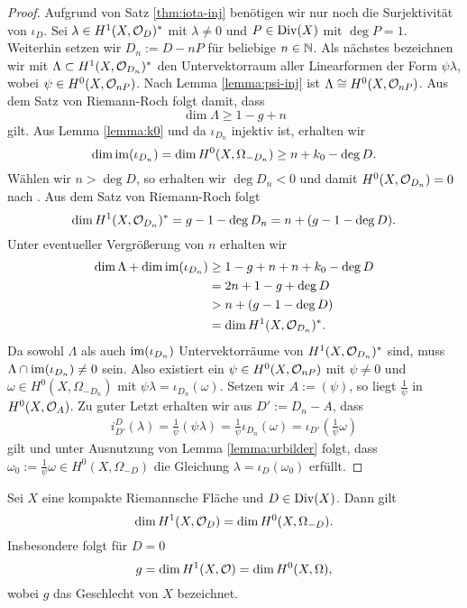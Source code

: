 \begin{proof}
  Aufgrund von Satz \ref{thm:iota-inj} benötigen wir nur noch die
  Surjektivität von $\iota_D$. Sei $\lambda \in H^1(X, \mathcal{O}_D)^\ast$
  mit $\lambda \neq 0$ und $P \in \operatorname{Div}(X)$ mit $\deg P = 1$. Weiterhin
  setzen wir $D_n := D - n P$ für beliebige $n \in \mathbb{N}$. Als nächstes
  bezeichnen wir mit $\Lambda \subset H^1(X, \mathcal{O}_{D_n})^\ast$ den
  Untervektorraum aller Linearformen der Form $\psi \lambda$, wobei
  $\psi \in H^0(X, \mathcal{O}_{nP})$. Nach Lemma \ref{lemma:psi-inj} ist
  $\Lambda \cong H^0(X, \mathcal{O}_{nP})$. Aus dem Satz von Riemann-Roch
  folgt damit, dass
  \[
  \dim \Lambda \geq 1 - g + n
  \]
  gilt. Aus Lemma \ref{lemma:k0} und da $\iota_{D_n}$ injektiv ist,
  erhalten wir
  \[
  \dim \operatorname{im}(\iota_{D_n}) = \dim H^0(X, \Omega_{-D_n}) \geq n + k_0 -
  \deg D.
  \]
  Wählen wir $n > \deg D$, so erhalten wir $\deg D_n < 0$ und damit
  $H^0(X, \mathcal{O}_{D_n}) = 0$ nach \cite[Satz 16.5]{For}. Aus dem Satz von Riemann-Roch folgt
  \[
  \dim H^1(X, \mathcal{O}_{D_n})^\ast = g - 1 - \deg D_n = n + ( g - 1 -
  \deg D).
  \]
  Unter eventueller Vergrößerung von $n$ erhalten wir
  \begin{align*}
    \dim \Lambda + \dim \operatorname{im}(\iota_{D_n}) & \geq 1 - g + n + n + k_0 -
    \deg D \\
    & = 2 n + 1 - g + \deg D \\
    & > n + (g - 1 - \deg D) \\
    & = \dim H^1(X, \mathcal{O}_{D_n})^\ast.
  \end{align*}
  Da sowohl $\Lambda$ als auch $\operatorname{im}(\iota_{D_n})$ Untervektorräume von
  $H^1(X, \mathcal{O}_{D_n})^\ast$ sind, muss $\Lambda \cap \operatorname{im}(\iota_{D_n})
  \neq 0$ sein. Also existiert ein $\psi \in H^0(X, \mathcal{O}_{nP})$ mit
  $\psi \neq 0$ und $\omega \in H^0(X, \Omega_{-D_n})$ mit $\psi
  \lambda = \iota_{D_n}(\omega)$. Setzen wir $A := (\psi)$, so liegt
  $\frac{1}{\psi}$ in $H^0(X, \mathcal{O}_A)$. Zu guter Letzt erhalten wir aus
  $D' := D_n - A$, dass
  \begin{align*}
    i_{D'}^D(\lambda) = \frac{1}{\psi} (\psi \lambda) =
    \frac{1}{\psi} \iota_{D_n}(\omega) = \iota_{D'} \left (
      \frac{1}{\psi} \omega \right )
  \end{align*}
  gilt und unter Ausnutzung von Lemma \ref{lemma:urbilder} folgt, dass
  $\omega_0 := \frac{1}{\psi} \omega \in H^0(X, \Omega_{-D})$ die
  Gleichung $\lambda = \iota_D(\omega_0)$ erfüllt.
\end{proof}

\begin{cor}
  \label{cor:dim-1-form}
  Sei $X$ eine kompakte Riemannsche Fläche und $D \in \operatorname{Div}(X)$. Dann
  gilt
  \[
  \dim H^1(X, \mathcal{O}_D) = \dim H^0(X, \Omega_{-D}).
  \]
  Insbesondere folgt für $D = 0$
  \[
  g = \dim H^1(X, \mathcal{O}) = \dim H^0(X, \Omega),
  \]
  wobei $g$ das Geschlecht von $X$ bezeichnet.
\end{cor}

